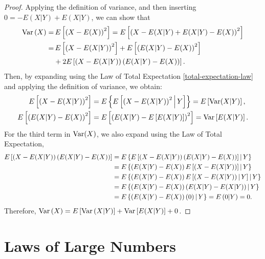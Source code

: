\begin{proof}
    Applying the definition of variance, and then inserting $0 = - E(X|Y) + E(X|Y)$, we can show that
    \begin{align*}
        \operatorname{Var}\left(X\right) =&\,E\left[\left(X - E(X)\right)^2\right] = E\left[\left(X - E(X|Y) + E(X|Y) - E(X)\right)^2\right] \\
        =&\,E\left[\left(X - E(X|Y)\right)^2\right] + E\left[\left(E(X|Y) - E(X)\right)^2\right] \\
        &+ 2E\left[\left(X - E(X|Y)\right)\left(E(X|Y) - E(X)\right)\right].
    \end{align*}
    Then, by expanding using the Law of Total Expectation \ref{total-expectation-law} and applying the definition of variance, we obtain:
    \begin{align*}
        E\left[\left(X - E(X|Y)\right)^2\right] &= E\left\{E\left[\left(X - E(X|Y)\right)^2\,\middle|\, Y\right]\right\} = E\left[\operatorname{Var}(X|Y)\right], \\
        E\left[\left(E(X|Y) - E(X)\right)^2\right] &= E\left[\left(E(X|Y) - E\left[E(X|Y)\right]\right)^2\right] = \operatorname{Var}\left[E(X|Y)\right].
    \end{align*}
    For the third term in $\operatorname{Var}(X)$, we also expand using the Law of Total Expectation,
    \begin{align*}
        E\left[\left(X - E(X|Y)\right)\left(E(X|Y) - E(X)\right)\right] &= E\left\{E\left[\left(X - E(X|Y)\right)\left(E(X|Y) - E(X)\right)\right]\,\middle|\, Y\right\} \\
        &= E\left\{\left(E(X|Y) - E(X)\right)E\left[\left(X - E(X|Y)\right)\right]\,\middle|\, Y\right\} \\
        &= E\left\{\left(E(X|Y) - E(X)\right)E\left[\left(X - E(X|Y)\right)\,\middle|\, Y\right]\,\middle|\, Y\right\} \\
        &= E\left\{\left(E(X|Y) - E(X)\right)\left(E(X|Y) - E(X|Y)\right)\,\middle|\, Y\right\} \\
        &= E\left\{\left(E(X|Y) - E(X)\right)\left(0\right)\,\middle|\, Y\right\} = E\left(0|Y\right) = 0.
    \end{align*}
    Therefore, $\operatorname{Var}\left(X\right) = E\left[\operatorname{Var}\left(X|Y\right)\right] + \operatorname{Var}\left[E(X|Y)\right] + 0$.
\end{proof}

\section{Laws of Large Numbers}

